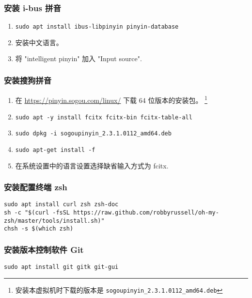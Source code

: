 \documentclass[
    11pt,
    cite=authoryear,
    device=normal,
    lang=cn,
    mode=simple,
    result=answer,
    toc=onecol,
]{elegantbook_sierxue}
\begin{document}

\subsubsection{安装 i-bus 拼音}%
\label{ssub:pinyin-i-bus}
\begin{enumerate}
    \item \lstinline{sudo apt install ibus-libpinyin pinyin-database}
    \item 安装中文语言。
    \item 将 "intelligent pinyin" 加入 "Input source".
\end{enumerate}

\subsubsection{安装搜狗拼音}%
\label{ssub:pinyin-sogou}
\begin{enumerate}
    \item 在 \href{https://pinyin.sogou.com/linux/}
        {https://pinyin.sogou.com/linux/} 下载 64 位版本的安装包。
        \footnote{安装本虚拟机时下载的版本是
            \lstinline{sogoupinyin_2.3.1.0112_amd64.deb}
        }
    \item \lstinline{sudo apt -y install fcitx fcitx-bin fcitx-table-all}
    \item \lstinline{sudo dpkg -i sogoupinyin_2.3.1.0112_amd64.deb}
    \item \lstinline{sudo apt-get install -f}
    \item 在系统设置中的语言设置选择缺省输入方式为 fcitx.
\end{enumerate}

\subsubsection{安装配置终端 zsh}%
\label{ssub:vm-zsh}

\begin{lstlisting}[escapeinside=``]
sudo apt install curl zsh zsh-doc
sh -c "$(curl -fsSL https://raw.github.com/robbyrussell/oh-my-zsh/master/tools/install.sh)"
chsh -s $(which zsh)
\end{lstlisting}

\subsubsection{安装版本控制软件 Git}%
\label{ssub:vm-git}

\begin{lstlisting}[escapeinside=``]
sudo apt install git gitk git-gui
\end{lstlisting}
\end{document}
